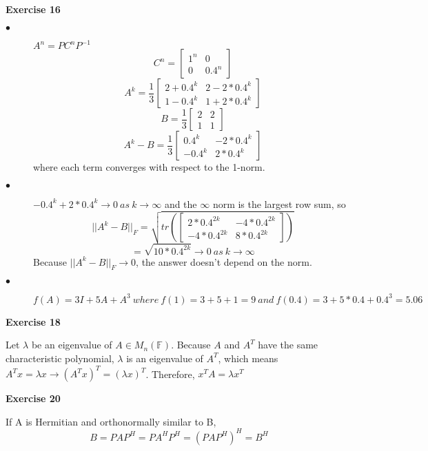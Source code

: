 \documentclass[letterpaper,12pt]{article}
\theoremstyle{definition}
\begin{document}
\noindent\textbf{Exercise 16} 
\begin{description}
\item[$\bullet$] $A^n = PC^nP^{-1}$
 \[C^n =
  \begin{bmatrix}
   1^n & 0 \\
   0 & 0.4^n
\end{bmatrix}
\]
 \[A^k = \frac{1}{3}
  \begin{bmatrix}
   2 + 0.4^k & 2 - 2 * 0.4^k \\
   1 - 0.4^k & 1 + 2 * 0.4^k
\end{bmatrix}
\]
 \[B = \frac{1}{3}
  \begin{bmatrix}
   2 & 2 \\
   1 & 1
\end{bmatrix}
\]
 \[A^k - B = \frac{1}{3}
  \begin{bmatrix}
   0.4^k & - 2 * 0.4^k \\
   - 0.4^k & 2 * 0.4^k
\end{bmatrix}
\]
where each term converges with respect to the 1-norm.
\item[$\bullet$] $-0.4^k + 2 * 0.4^k \rightarrow 0 \ as \ k \rightarrow \infty$ and the $\infty$ norm is the largest row sum, so
\[||A^k -B||_F = \sqrt{tr(\begin{bmatrix}
   2 * 0.4^{2k} & -4 * 0.4^{2k} \\
   -4 * 0.4^{2k} & 8 * 0.4^{2k}
\end{bmatrix})}\]
\[= \sqrt{10 * 0.4^{2k}} \rightarrow 0 \ as \ k \rightarrow \infty\]
Because $||A^k - B||_F \rightarrow 0$, the answer doesn't depend on the norm.
\item[$\bullet$] $f(A) = 3I + 5A + A^3 \ where \ f(1) = 3 + 5 + 1 = 9 \ and \ f(0.4) = 3 + 5 * 0.4 + 0.4^3 = 5.06$
\end{description}

\noindent\textbf{Exercise 18} 
\begin{description}
\item Let $\lambda$ be an eigenvalue of $A \in M_n(\mathbb{F})$. Because $A$ and $A^T$ have the same characteristic polynomial, $\lambda$ is an eigenvalue of $A^T$, which means $A^Tx = \lambda x \rightarrow (A^Tx)^T = (\lambda x)^T$. Therefore, $x^TA = \lambda x^T$
\end{description}

\noindent\textbf{Exercise 20} 
\begin{description}
\item If A is Hermitian and orthonormally similar to B,
\[ B = PAP^H = PA^HP^H = (PAP^H)^H = B^H\]
\end{description}
\end{document}
